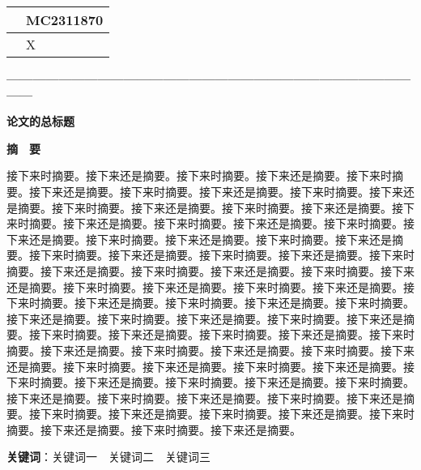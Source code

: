 \thispagestyle{empty}   %

\begin{table}[]
    \centering
    \renewcommand\arraystretch{2}
    \begin{tabular}{|l|l|}
    \hline
    \quad & MC2311870\quad \\ \hline
       & X         \\ \hline
    \end{tabular}
\end{table}



\begin{center}
    \textbf{—————————————————————————————————}

    \textbf{\fontsize{20}{1.5}论文的总标题}

    \textbf{摘　要}
\end{center}

接下来时摘要。接下来还是摘要。接下来时摘要。接下来还是摘要。接下来时摘要。接下来还是摘要。接下来时摘要。接下来还是摘要。接下来时摘要。接下来还是摘要。接下来时摘要。接下来还是摘要。接下来时摘要。接下来还是摘要。接下来时摘要。接下来还是摘要。接下来时摘要。接下来还是摘要。接下来时摘要。接下来还是摘要。接下来时摘要。接下来还是摘要。接下来时摘要。接下来还是摘要。接下来时摘要。接下来还是摘要。接下来时摘要。接下来还是摘要。接下来时摘要。接下来还是摘要。接下来时摘要。接下来还是摘要。接下来时摘要。接下来还是摘要。接下来时摘要。接下来还是摘要。接下来时摘要。接下来还是摘要。接下来时摘要。接下来还是摘要。接下来时摘要。接下来还是摘要。接下来时摘要。接下来还是摘要。接下来时摘要。接下来还是摘要。接下来时摘要。接下来还是摘要。接下来时摘要。接下来还是摘要。接下来时摘要。接下来还是摘要。接下来时摘要。接下来还是摘要。接下来时摘要。接下来还是摘要。接下来时摘要。接下来还是摘要。接下来时摘要。接下来还是摘要。接下来时摘要。接下来还是摘要。接下来时摘要。接下来还是摘要。接下来时摘要。接下来还是摘要。接下来时摘要。接下来还是摘要。接下来时摘要。接下来还是摘要。接下来时摘要。接下来还是摘要。接下来时摘要。接下来还是摘要。接下来时摘要。接下来还是摘要。接下来时摘要。接下来还是摘要。接下来时摘要。接下来还是摘要。

\textbf{关键词}：关键词一　关键词二　关键词三

\newpage
\tableofcontents
\thispagestyle{empty}